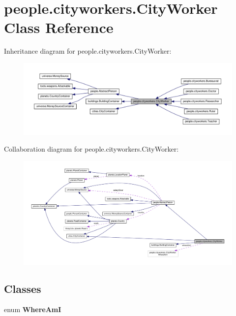 \hypertarget{classpeople_1_1cityworkers_1_1_city_worker}{}\section{people.\+cityworkers.\+City\+Worker Class Reference}
\label{classpeople_1_1cityworkers_1_1_city_worker}


Inheritance diagram for people.\+cityworkers.\+City\+Worker\+:\nopagebreak
\begin{figure}[H]
\begin{center}
\leavevmode
\includegraphics[width=350pt]{classpeople_1_1cityworkers_1_1_city_worker__inherit__graph}
\end{center}
\end{figure}


Collaboration diagram for people.\+cityworkers.\+City\+Worker\+:\nopagebreak
\begin{figure}[H]
\begin{center}
\leavevmode
\includegraphics[width=350pt]{classpeople_1_1cityworkers_1_1_city_worker__coll__graph}
\end{center}
\end{figure}
\subsection*{Classes}
\begin{DoxyCompactItemize}
\item 
enum {\bfseries Where\+AmI}
\end{DoxyCompactItemize}
